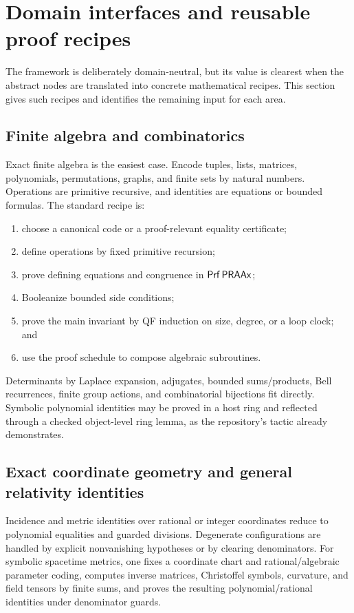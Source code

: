 \section{Domain interfaces and reusable proof recipes}
\label{sec:domains}

The framework is deliberately domain-neutral, but its value is clearest when the
abstract nodes are translated into concrete mathematical recipes.  This section gives
such recipes and identifies the remaining input for each area.

\subsection{Finite algebra and combinatorics}

Exact finite algebra is the easiest case.  Encode tuples, lists, matrices, polynomials,
permutations, graphs, and finite sets by natural numbers.  Operations are primitive
recursive, and identities are equations or bounded formulas.  The standard recipe is:

\begin{enumerate}[label=\arabic*.,leftmargin=2.2em]
\item choose a canonical code or a proof-relevant equality certificate;
\item define operations by fixed primitive recursion;
\item prove defining equations and congruence in \(\mathsf{Prf}\,\mathsf{PRAAx}\);
\item Booleanize bounded side conditions;
\item prove the main invariant by QF induction on size, degree, or a loop clock; and
\item use the proof schedule to compose algebraic subroutines.
\end{enumerate}

Determinants by Laplace expansion, adjugates, bounded sums/products, Bell recurrences,
finite group actions, and combinatorial bijections fit directly.  Symbolic polynomial
identities may be proved in a host ring and reflected through a checked object-level
ring lemma, as the repository's  tactic already demonstrates.

\subsection{Exact coordinate geometry and general relativity identities}

Incidence and metric identities over rational or integer coordinates reduce to
polynomial equalities and guarded divisions.  Degenerate configurations are handled by
explicit nonvanishing hypotheses or by clearing denominators.  For symbolic spacetime
metrics, one fixes a coordinate chart and rational/algebraic parameter coding, computes
inverse matrices, Christoffel symbols, curvature, and field tensors by finite sums, and
proves the resulting polynomial/rational identities under denominator guards.

